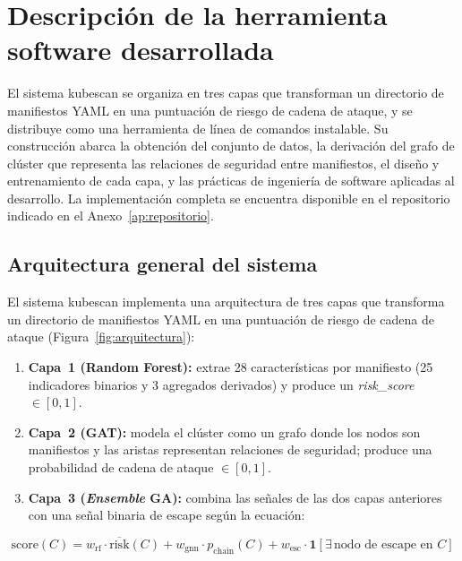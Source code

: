 \chapter{Descripción de la herramienta software desarrollada}
\label{cap:herramienta}

El sistema kubescan se organiza en tres capas que transforman un
directorio de manifiestos \acs{YAML} en una puntuación de riesgo de cadena de
ataque, y se distribuye como una herramienta de línea de comandos instalable.
Su construcción abarca la obtención del conjunto de datos, la derivación del
grafo de clúster que representa las relaciones de seguridad entre manifiestos,
el diseño y entrenamiento de cada capa, y las prácticas de ingeniería de
software aplicadas al desarrollo. La implementación completa se encuentra
disponible en el repositorio indicado en el Anexo~\ref{ap:repositorio}.

\section{Arquitectura general del sistema}

El sistema kubescan implementa una arquitectura de tres capas que transforma
un directorio de manifiestos \acs{YAML} en una puntuación de riesgo de cadena de ataque
(Figura~\ref{fig:arquitectura}):

\begin{enumerate}
  \item \textbf{Capa~1 (Random Forest):} extrae 28 características por manifiesto
    (25 indicadores binarios y 3 agregados derivados) y produce un
    \textit{risk\_score} \(\in [0,1]\).
  \item \textbf{Capa~2 (\ac{GAT}):} modela el clúster como un grafo donde los nodos
    son manifiestos y las aristas representan relaciones de seguridad; produce una
    probabilidad de cadena de ataque \(\in [0,1]\).
  \item \textbf{Capa~3 (\textit{Ensemble} \acs{GA}):} combina las señales de las dos capas anteriores
    con una señal binaria de escape según la ecuación:
\end{enumerate}

\begin{equation}
  \text{score}(C) = w_{\text{rf}} \cdot \overline{\text{risk}}(C)
                  + w_{\text{gnn}} \cdot p_{\text{chain}}(C)
                  + w_{\text{esc}} \cdot \mathbf{1}[\exists\,\text{nodo de escape en }C]
  \label{eq:ensemble}
\end{equation}

